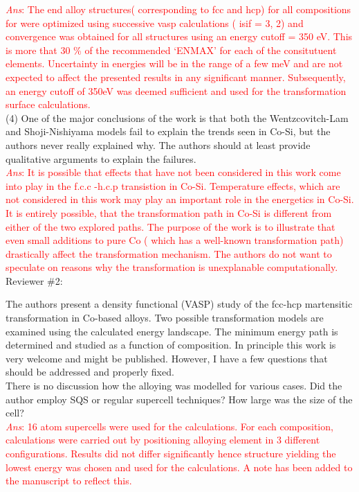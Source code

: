 \documentclass[letterpaper,10pt, notitlepage, leqno]{article}
\begin{document}
\textcolor{red}{\textit{Ans}: The end alloy structures( corresponding to fcc and hcp) for all compositions for  were optimized using successive vasp calculations ( isif = 3, 2) and convergence was obtained for all structures using an energy cutoff = 350 eV. This is more that 30 \% of the recommended `ENMAX' for each of the consitutuent elements. Uncertainty in energies will be in the range of a few meV and are not expected to affect the presented results in any significant manner. Subsequently, an energy cutoff of 350eV was deemed sufficient and used for the transformation surface calculations.} \\


(4) One of the major conclusions of the work is that both the Wentzcovitch-Lam and Shoji-Nishiyama models fail to explain the trends seen in Co-Si, but the authors never really explained why. The authors should at least provide qualitative arguments to explain the failures. \\

\textcolor{red}{\textit{Ans}: It is possible that effects that have not been considered in this work come into play in the f.c.c -h.c.p transistion in Co-Si. Temperature effects, which are not considered in this work may play an important role in the energetics in Co-Si. It is entirely possible, that the transformation path in Co-Si is different from either of the two explored paths. The purpose of the work is to illustrate that even small additions to pure Co ( which has a well-known transformation path) drastically affect the transformation mechanism. The authors do not want to speculate on reasons why the transformation is unexplanable computationally.} \\


Reviewer \#2:

The authors present a density functional (VASP) study of the fcc-hcp martensitic transformation in Co-based alloys. Two possible transformation models are examined using the calculated energy landscape. The minimum energy path is determined and studied as a function of composition. In principle this work is very welcome and might be published. However, I have a few questions that should be addressed and properly fixed. \\

There is no discussion how the alloying was modelled for various cases. Did the author employ SQS or regular supercell techniques? How large was the size of the cell? \\
\textcolor{red}{\textit{Ans}: 16 atom supercells were used for the calculations. For each composition, calculations were carried out by positioning alloying element in 3 different configurations. Results did not differ significantly hence structure yielding the lowest energy was chosen and used for the calculations. A note has been added to the manuscript to reflect this.} \\
\end{document}
